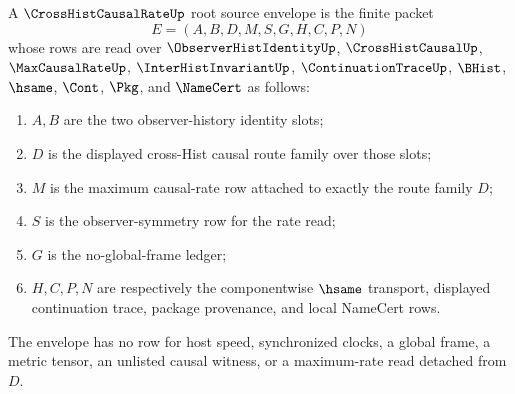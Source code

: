 \begin{definition}
\label{def:cross-hist-causal-rate-root-source-envelope}
A $\CrossHistCausalRateUp$ root source envelope is the finite packet
$$
E=(A,B,D,M,S,G,H,C,P,N)
$$
whose rows are read over $\ObserverHistIdentityUp$, $\CrossHistCausalUp$,
$\MaxCausalRateUp$, $\InterHistInvariantUp$, $\ContinuationTraceUp$,
$\BHist$, $\hsame$, $\Cont$, $\Pkg$, and $\NameCert$ as follows:
\begin{enumerate}
\item $A,B$ are the two observer-history identity slots;
\item $D$ is the displayed cross-Hist causal route family over those slots;
\item $M$ is the maximum causal-rate row attached to exactly the route family
  $D$;
\item $S$ is the observer-symmetry row for the rate read;
\item $G$ is the no-global-frame ledger;
\item $H,C,P,N$ are respectively the componentwise $\hsame$ transport,
  displayed continuation trace, package provenance, and local NameCert rows.
\end{enumerate}
The envelope has no row for host speed, synchronized clocks, a global frame, a
metric tensor, an unlisted causal witness, or a maximum-rate read detached from
$D$.
\end{definition}

